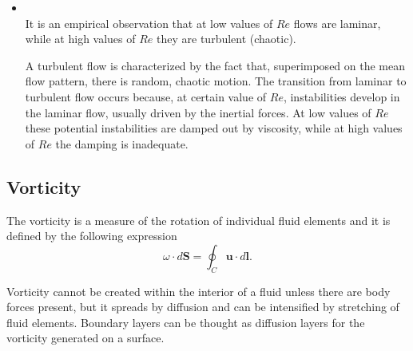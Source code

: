 \begin{itemize}
\item{}\\It is an empirical observation that at low values of $Re$ flows are laminar, while at high values of $Re$ they are turbulent (chaotic).

A turbulent flow is characterized by the fact that, superimposed on the mean flow pattern, there is random, chaotic motion. The transition from laminar to turbulent flow occurs because, at certain value of $Re$, instabilities develop in the laminar flow, usually driven by the inertial forces. At low values of $Re$ these potential instabilities are damped out by viscosity, while at high values of $Re$ the damping is inadequate.

\end{itemize}

\subsection{Vorticity}
The vorticity is a measure of the rotation of individual fluid elements and it is defined by the following expression
$$\omega\cdot d\mathbf{S}=\oint_C\mathbf{u}\cdot d\mathbf{l}.$$

Vorticity cannot be created within the interior of a fluid unless there are body forces present, but it spreads by diffusion and can be intensified by stretching of fluid elements. Boundary layers can be thought as diffusion layers for the vorticity generated on a surface.

